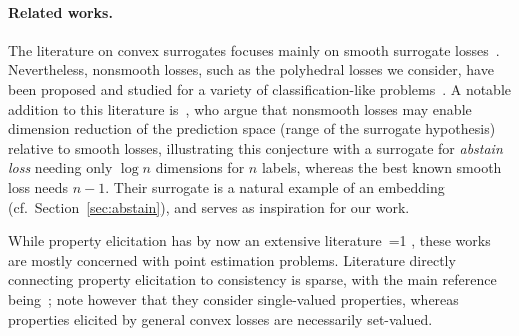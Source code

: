 \documentclass[12pt]{article}
\newcommand{\Comments}{1}
\newcommand{\mynote}[2]{\ifnum\Comments=1\textcolor{#1}{#2}\fi}
\newcommand{\mytodo}[2]{\ifnum\Comments=1%
  \todo[linecolor=#1!80!black,backgroundcolor=#1,bordercolor=#1!80!black]{#2}\fi}
\newcommand{\raft}[1]{\mytodo{green!20!white}{RF: #1}}
\newcommand{\jessie}[1]{\mynote{purple}{[JF: #1]}}
\newcommand{\jessiet}[1]{\mytodo{purple!20!white}{JF: #1}}
\begin{document}

\paragraph{Related works.}
The literature on convex surrogates focuses mainly on smooth surrogate losses~\cite{crammer2001algorithmic,bartlett2006convexity,bartlett2008classification, duchi2018multiclass, williamson2016composite, reid2010composite}.
Nevertheless, nonsmooth losses, such as the polyhedral losses we consider, have been proposed and studied for a variety of classification-like problems~\cite{yang2018consistency,yu2018lovasz,lapin2015top}.
A notable addition to this literature is~\citet{ramaswamy2018consistent}, who argue that nonsmooth losses may enable dimension reduction of the prediction space (range of the surrogate hypothesis) relative to smooth losses, illustrating this conjecture with a surrogate for \emph{abstain loss} needing only $\log n$ dimensions for $n$ labels, whereas the best known smooth loss needs $n-1$.
Their surrogate is a natural example of an embedding (cf.~Section~\ref{sec:abstain}), and serves as inspiration for our work.

While property elicitation has by now an extensive literature~\cite{savage1971elicitation,osband1985information-eliciting,lambert2008eliciting,gneiting2011making,steinwart2014elicitation,frongillo2015vector-valued,fissler2016higher,lambert2018elicitation}\raft{others? already a bit much...}, these works are mostly concerned with point estimation problems.
Literature directly connecting property elicitation to consistency is sparse, with the main reference being~\citet{agarwal2015consistent}; note however that they consider single-valued properties, whereas properties elicited by general convex losses are necessarily set-valued.
\end{document}
